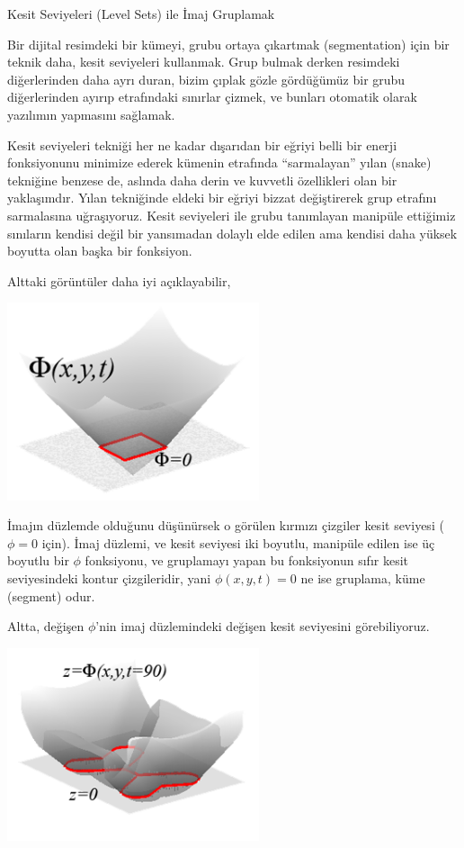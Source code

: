\documentclass[12pt,fleqn]{article}\usepackage{../../common}
\begin{document}
Kesit Seviyeleri (Level Sets) ile İmaj Gruplamak 

Bir dijital resimdeki bir kümeyi, grubu ortaya çıkartmak (segmentation) için bir
teknik daha, kesit seviyeleri kullanmak. Grup bulmak derken resimdeki
diğerlerinden daha ayrı duran, bizim çıplak gözle gördüğümüz bir grubu
diğerlerinden ayırıp etrafındaki sınırlar çizmek, ve bunları otomatik
olarak yazılımın yapmasını sağlamak. 

Kesit seviyeleri tekniği her ne kadar dışarıdan bir eğriyi belli bir enerji
fonksiyonunu minimize ederek kümenin etrafında ``sarmalayan'' yılan (snake)
tekniğine benzese de, aslında daha derin ve kuvvetli özellikleri olan bir
yaklaşımdır. Yılan tekniğinde eldeki bir eğriyi bizzat değiştirerek grup
etrafını sarmalasına uğraşıyoruz. Kesit seviyeleri ile grubu tanımlayan manipüle
ettiğimiz sınıların kendisi değil bir yansımadan dolaylı elde edilen ama kendisi
daha yüksek boyutta olan başka bir fonksiyon.

Alttaki görüntüler daha iyi açıklayabilir,

\includegraphics[width=20em]{compscieng_app50lset_02.png}

İmajın düzlemde olduğunu düşünürsek o görülen kırmızı çizgiler kesit seviyesi
($\phi=0$ için). İmaj düzlemi, ve kesit seviyesi iki boyutlu, manipüle edilen
ise üç boyutlu bir $\phi$ fonksiyonu, ve gruplamayı yapan bu fonksiyonun sıfır
kesit seviyesindeki kontur çizgileridir, yani $\phi(x,y,t) = 0$ ne ise gruplama,
küme (segment) odur.

Altta, değişen $\phi$'nin imaj düzlemindeki değişen kesit seviyesini görebiliyoruz.

\includegraphics[width=20em]{compscieng_app50lset_01.png}
\end{document}
